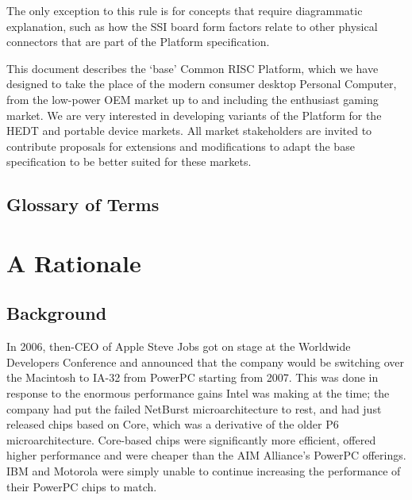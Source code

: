 \documentclass[12pt]{report}
\begin{document}
The only exception to this rule is for concepts that require diagrammatic explanation, such as how the SSI board form
factors relate to other physical connectors that are part of the Platform specification.

This document describes the `base' Common RISC Platform, which we have designed to take the place of the modern consumer
desktop Personal Computer, from the low-power OEM market up to and including the enthusiast gaming market. We are very
interested in developing variants of the Platform for the HEDT and portable device markets. All market stakeholders are
invited to contribute proposals for extensions and modifications to adapt the base specification to be better suited for
these markets.

\section{Glossary of Terms}
\newpage

\chapter{A Rationale}
\newpage

\section{Background}
In 2006, then-CEO of Apple Steve Jobs got on stage at the Worldwide Developers Conference and announced that the company
would be switching over the Macintosh to IA-32 from PowerPC starting from 2007. This was done in response to the enormous
performance gains Intel was making at the time; the company had put the failed NetBurst microarchitecture to rest, and
had just released chips based on Core, which was a derivative of the older P6 microarchitecture. Core-based chips were
significantly more efficient, offered higher performance and were cheaper than the AIM Alliance's PowerPC offerings. IBM
and Motorola were simply unable to continue increasing the performance of their PowerPC chips to match.
\end{document}
